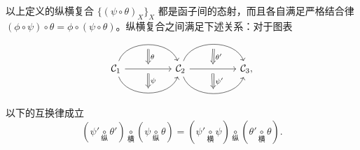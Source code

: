 \begin{lemma}\label{prop:naturaltrans-associativity}
	以上定义的纵横复合 $\{ (\psi \circ \theta)_X \}_X$ 都是函子间的态射，而且各自满足严格结合律 $(\phi \circ \psi) \circ \theta = \phi \circ (\psi \circ \theta)$。纵横复合之间满足下述关系：对于图表
	\[\begin{tikzcd}
		\mathcal{C}_1
		\arrow[bend left=70, rr, ""' name=U]
		\arrow[rr, "" name=MM, ""' name=M]
		\arrow[bend right=70, rr, "" name=D] & &
		\arrow[Rightarrow, to path=(U) -- (MM) \tikztonodes, "\theta"] \arrow[Rightarrow, to path=  (M) -- (D) \tikztonodes, "\psi"] \mathcal{C}_2
		\arrow[bend left=70, rr, ""' name=V]
		\arrow[rr, "" name=NN, ""' name=N]
		\arrow[bend right=70, rr, "" name=E] & &
		\arrow[Rightarrow, to path=(V) -- (NN) \tikztonodes, "\theta'"] \arrow[Rightarrow, to path=  (N) -- (E) \tikztonodes, "\psi'"] \mathcal{C}_3 ,
	\end{tikzcd} \]
	以下的互换律成立
	\[ ( \psi' \underset{\text{纵}}{\circ} \theta') \underset{\text{横}}{\circ} ( \psi \underset{\text{纵}}{\circ} \theta) = ( \psi' \underset{\text{横}}{\circ} \psi ) \underset{\text{纵}}{\circ} ( \theta' \underset{\text{横}}{\circ} \theta).  \]
\end{lemma}
